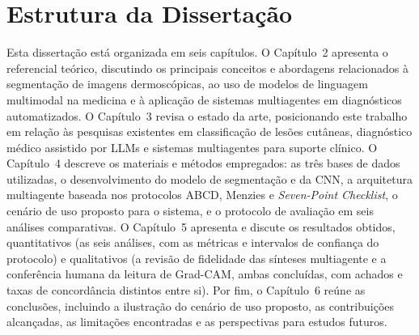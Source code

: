 \section{Estrutura da Dissertação}
Esta dissertação está organizada em seis capítulos. O Capítulo~2 apresenta o referencial teórico, discutindo os principais conceitos e abordagens relacionados à segmentação de imagens dermoscópicas, ao uso de modelos de linguagem multimodal na medicina e à aplicação de sistemas multiagentes em diagnósticos automatizados. O Capítulo~3 revisa o estado da arte, posicionando este trabalho em relação às pesquisas existentes em classificação de lesões cutâneas, diagnóstico médico assistido por LLMs e sistemas multiagentes para suporte clínico. O Capítulo~4 descreve os materiais e métodos empregados: as três bases de dados utilizadas, o desenvolvimento do modelo de segmentação e da CNN, a arquitetura multiagente baseada nos protocolos ABCD, Menzies e \textit{Seven-Point Checklist}, o cenário de uso proposto para o sistema, e o protocolo de avaliação em seis análises comparativas. O Capítulo~5 apresenta e discute os resultados obtidos, quantitativos (as seis análises, com as métricas e intervalos de confiança do protocolo) e qualitativos (a revisão de fidelidade das sínteses multiagente e a conferência humana da leitura de Grad-CAM, ambas concluídas, com achados e taxas de concordância distintos entre si). Por fim, o Capítulo~6 reúne as conclusões, incluindo a ilustração do cenário de uso proposto, as contribuições alcançadas, as limitações encontradas e as perspectivas para estudos futuros.
